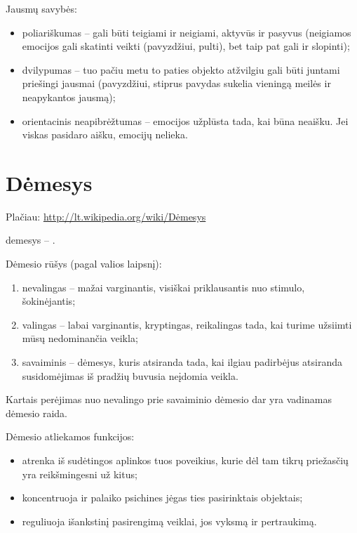 Jausmų savybės:
\begin{itemize}
  \item poliariškumas – gali būti teigiami ir neigiami, aktyvūs ir pasyvus
    (neigiamos emocijos gali skatinti veikti (pavyzdžiui, pulti), bet taip 
    pat gali ir slopinti);
  \item dvilypumas – tuo pačiu metu to paties objekto atžvilgiu gali būti
    juntami priešingi jausmai (pavyzdžiui, stiprus pavydas sukelia 
    vieningą meilės ir neapykantos jausmą);
  \item orientacinis neapibrėžtumas – emocijos užplūsta tada, kai būna
    neaišku. Jei viskas pasidaro aišku, emocijų nelieka.
\end{itemize}

\section{Dėmesys}

\label{tema:demesys}

Plačiau: \url{http://lt.wikipedia.org/wiki/Dėmesys}

\Gls{demesys} – .

Dėmesio rūšys (pagal valios laipsnį):

\begin{enumerate}
  \item nevalingas – mažai varginantis, visiškai priklausantis nuo stimulo, 
    šokinėjantis;
  \item valingas – labai varginantis, kryptingas, reikalingas tada, kai 
    turime užsiimti mūsų nedominančia veikla;
  \item savaiminis – dėmesys, kuris atsiranda tada, kai ilgiau padirbėjus
    atsiranda susidomėjimas iš pradžių buvusia neįdomia veikla.
\end{enumerate}

Kartais perėjimas nuo nevalingo prie savaiminio dėmesio dar yra vadinamas
dėmesio raida.

Dėmesio atliekamos funkcijos:

\begin{itemize}
  \item atrenka iš sudėtingos aplinkos tuos poveikius, kurie dėl tam tikrų
    priežasčių yra reikšmingesni už kitus;
  \item koncentruoja ir palaiko psichines jėgas ties pasirinktais objektais;
  \item reguliuoja išankstinį pasirengimą veiklai, jos vyksmą ir 
    pertraukimą.
\end{itemize}

